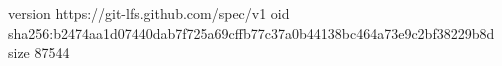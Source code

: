 version https://git-lfs.github.com/spec/v1
oid sha256:b2474aa1d07440dab7f725a69cffb77c37a0b44138bc464a73e9c2bf38229b8d
size 87544
